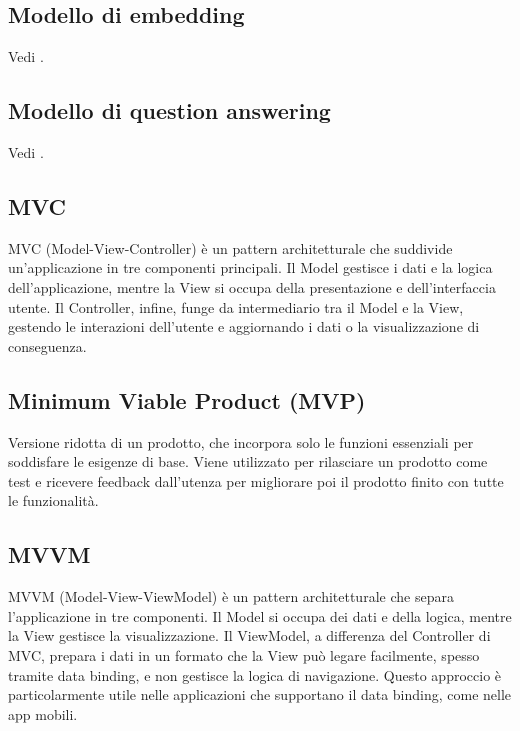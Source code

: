 \hypertarget{sec:modello_di_embedding}{}
\subsection*{Modello di embedding}
Vedi .

\hypertarget{sec:modello_di_question_answering}{}
\subsection*{Modello di question answering}
Vedi .

\hypertarget{sec:MVC}{}
\subsection*{MVC}
MVC (Model-View-Controller) è un pattern architetturale che suddivide un'applicazione in tre componenti principali.
Il Model gestisce i dati e la logica dell'applicazione, mentre la View si occupa della presentazione e dell'interfaccia utente. 
Il Controller, infine, funge da intermediario tra il Model e la View, gestendo le interazioni dell'utente e aggiornando i dati o la visualizzazione di conseguenza.

\hypertarget{sec:MVP}{}
\subsection*{Minimum Viable Product (MVP)}
Versione ridotta di un prodotto, che incorpora solo le funzioni essenziali per soddisfare le esigenze di base. Viene utilizzato per rilasciare un prodotto 
come test e ricevere feedback dall’utenza per migliorare poi il prodotto finito con tutte le funzionalità.

\hypertarget{sec:MVVM}{}
\subsection*{MVVM}
MVVM (Model-View-ViewModel) è un pattern architetturale che separa l'applicazione in tre componenti. 
Il Model si occupa dei dati e della logica, mentre la View gestisce la visualizzazione. 
Il ViewModel, a differenza del Controller di MVC, prepara i dati in un formato che la View può legare facilmente, spesso tramite data binding, e non gestisce la logica di navigazione. 
Questo approccio è particolarmente utile nelle applicazioni che supportano il data binding, come nelle app mobili.
\newpage


